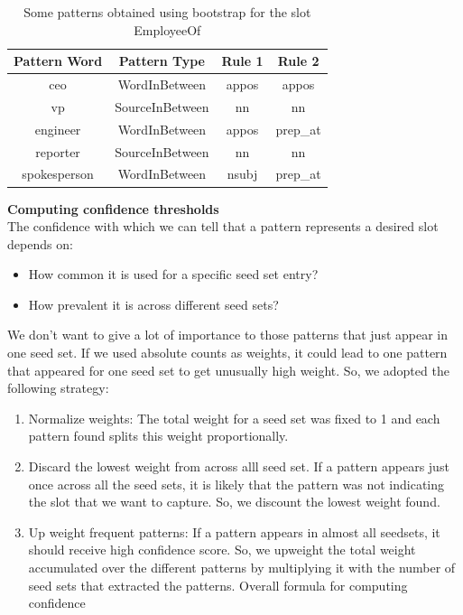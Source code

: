\begin{itemize}[label={}]
\begin{table}[ht]
\centering
\begin{tabular}{|c|c|c|c|}
\hline
Pattern Word & Pattern Type & Rule 1 & Rule 2 \\
\hline
ceo & WordInBetween & appos & appos \\
vp & SourceInBetween & nn & nn \\
engineer & WordInBetween & appos & prep\_at \\
reporter & SourceInBetween & nn & nn \\
spokesperson & WordInBetween & nsubj & prep\_at \\
\hline
\end{tabular}
\caption{Some patterns obtained using bootstrap for the slot EmployeeOf}
\label{tab:patterns_employeeOf}
\end{table}

\textbf{Computing confidence thresholds} \\
The confidence with which we can tell that a pattern represents a desired slot depends on:
\begin{itemize}
\item How common it is used for a specific seed set entry? 
\item How prevalent it is across different seed sets? 
\end{itemize}

We don’t want to give a lot of importance to those patterns that just appear in one seed set. If we used absolute counts as weights, it could lead to one pattern that appeared for one seed set to get unusually high weight. So, we adopted the following strategy:
\begin{enumerate}
\item Normalize weights: The total weight for a seed set was fixed to 1 and each pattern found splits this weight proportionally.
\item Discard the lowest weight from across alll seed set. If a pattern appears just once across all the seed sets, it is likely that the pattern was not indicating the slot that we want to capture. So, we discount the lowest weight found.
\item Up weight frequent patterns: If a pattern appears in almost all seedsets, it should receive high confidence score. So, we upweight the total weight accumulated over the different patterns by multiplying it with the number of seed sets that extracted the patterns.
Overall formula for computing confidence
\end{enumerate}


\end{itemize}
